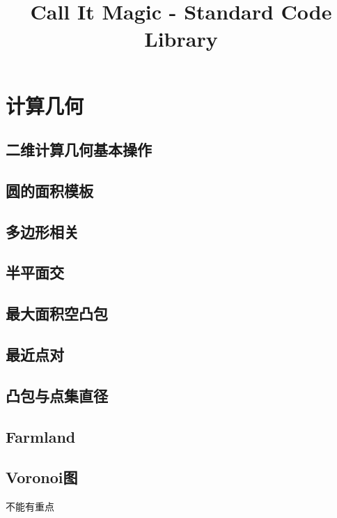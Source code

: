 \documentclass[landscape, twocolumn, 8pt, a4paper, twoside]{extarticle}
\title{Call It Magic - Standard Code Library}
\begin{document}
\tableofcontents
\newpage

\section{计算几何}

  \subsection{二维计算几何基本操作}
    
    
  \subsection{圆的面积模板}
    

  \subsection{多边形相关}
    

  \subsection{半平面交}
    

  \subsection{最大面积空凸包}
    

  \subsection{最近点对}
    

  \subsection{凸包与点集直径}
    

  \subsection{Farmland}
    

  \subsection{Voronoi图}
    不能有重点
    
\end{document}
